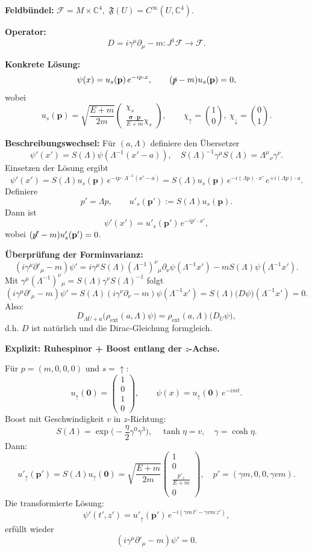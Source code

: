 \documentclass[10pt, letterpaper]{article}
\newcommand{\C}{\mathbb{C}}
\begin{document}
\textbf{Feldbündel:}
\(\mathcal F = M\times\C^4,\)
\(\mathfrak F(U)=C^\infty(U,\C^4).\)

\textbf{Operator:}
\[
D = i\gamma^\mu\partial_\mu - m : J^1\mathcal F \to \mathcal F.
\]

\textbf{Konkrete Lösung:}
\[
\psi(x) = u_s(\mathbf p)\,e^{-ip\cdot x},
\qquad
(\slashed{p}-m)u_s(\mathbf p)=0,
\]
wobei
\[
u_s(\mathbf p)
=\sqrt{\frac{E+m}{2m}}
\begin{pmatrix}
\chi_s\\[2pt]
\frac{\boldsymbol{\sigma}\cdot\mathbf p}{E+m}\chi_s
\end{pmatrix},
\qquad
\chi_\uparrow=\binom10,\ \chi_\downarrow=\binom01.
\]

\textbf{Beschreibungswechsel:}  
Für $(a,\Lambda)$ definiere den Übersetzer
\[
\psi'(x') = S(\Lambda)\psi(\Lambda^{-1}(x'-a)),
\quad
S(\Lambda)^{-1}\gamma^\mu S(\Lambda)=\Lambda^\mu{}_\nu\gamma^\nu.
\]
Einsetzen der Lösung ergibt
\[
\psi'(x') = S(\Lambda)u_s(\mathbf p)\,e^{-ip\cdot\Lambda^{-1}(x'-a)}
= S(\Lambda)u_s(\mathbf p)\,e^{-i(\Lambda p)\cdot x'}\,e^{+i(\Lambda p)\cdot a}.
\]
Definiere
\[
p'=\Lambda p,
\qquad
u'_s(\mathbf p'):=S(\Lambda)u_s(\mathbf p).
\]
Dann ist
\[
\psi'(x')=u'_s(\mathbf p')\,e^{-ip'\cdot x'},
\]
wobei $(\slashed{p'}-m)u'_s(\mathbf p')=0$.

\textbf{Überprüfung der Forminvarianz:}
\[
(i\gamma^\mu\partial'_\mu - m)\psi'
= i\gamma^\mu S(\Lambda)(\Lambda^{-1})^\nu{}_\mu \partial_\nu \psi(\Lambda^{-1}x')
- mS(\Lambda)\psi(\Lambda^{-1}x').
\]
Mit $\gamma^\mu (\Lambda^{-1})^\nu{}_\mu = S(\Lambda)\gamma^\nu S(\Lambda)^{-1}$ folgt
\[
(i\gamma^\mu\partial'_\mu - m)\psi'
= S(\Lambda)(i\gamma^\nu\partial_\nu - m)\psi(\Lambda^{-1}x')
= S(\Lambda)\big(D\psi\big)(\Lambda^{-1}x')
= 0.
\]
Also:
\[
D_{\Lambda U + a}\big(\rho_{\mathrm{ext}}(a,\Lambda)\psi\big)
= \rho_{\mathrm{ext}}(a,\Lambda)\big(D_U\psi\big),
\]
d.h. $D$ ist natürlich und die Dirac-Gleichung formgleich.

\bigskip
\textbf{Explizit: Ruhespinor + Boost entlang der $z$-Achse.}

Für $p=(m,0,0,0)$ und $s=\uparrow$:
\[
u_\uparrow(\mathbf 0)=
\begin{pmatrix}1\\0\\1\\0\end{pmatrix},
\qquad
\psi(x)=u_\uparrow(\mathbf 0)\,e^{-imt}.
\]
Boost mit Geschwindigkeit $v$ in $z$-Richtung:
\[
S(\Lambda)=\exp\!\Big(-\frac{\eta}{2}\gamma^0\gamma^3\Big),
\quad
\tanh\eta=v,\quad
\gamma=\cosh\eta.
\]
Dann:
\[
u'_\uparrow(\mathbf p')
=S(\Lambda)u_\uparrow(\mathbf 0)
=\sqrt{\frac{E+m}{2m}}
\begin{pmatrix}
1\\[2pt]0\\[2pt]\frac{p'_z}{E+m}\\[2pt]0
\end{pmatrix},
\quad
p'=(\gamma m,0,0,\gamma v m).
\]
Die transformierte Lösung:
\[
\psi'(t',z')=u'_\uparrow(\mathbf p')\,e^{-i(\gamma m\, t' - \gamma v m\, z')},
\]
erfüllt wieder
\[
(i\gamma^\mu\partial'_\mu - m)\psi'=0.
\]
\end{document}
